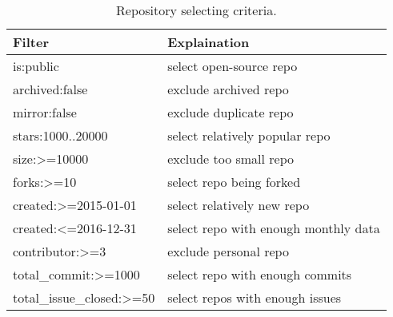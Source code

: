 \documentclass[sigconf,review,anonymous]{acmart}
\begin{document}




 

\begin{table}[!b]
\caption{Repository selecting criteria.}
\label{tbl:select}
\begin{adjustbox}{max width=0.48\textwidth}
\begin{tabular}{l|l}
\rowcolor[HTML]{BDBDBD} 
{\color[HTML]{000000} Filter} & {\color[HTML]{000000} Explaination} \\ \hline
\rowcolor[HTML]{FFFFFF} 
{\color[HTML]{000000} is:public} & {\color[HTML]{000000} select open-source repo} \\
\rowcolor[HTML]{F3F3F3} 
{\color[HTML]{000000} archived:false} & {\color[HTML]{000000} exclude archived repo} \\
\rowcolor[HTML]{FFFFFF} 
{\color[HTML]{000000} mirror:false} & {\color[HTML]{000000} exclude duplicate repo} \\
\rowcolor[HTML]{F3F3F3} 
{\color[HTML]{000000} stars:1000..20000} & {\color[HTML]{000000} select relatively popular repo} \\
\rowcolor[HTML]{FFFFFF} 
{\color[HTML]{000000} size:\textgreater{}=10000} & {\color[HTML]{000000} exclude too small repo} \\
\rowcolor[HTML]{F3F3F3} 
{\color[HTML]{000000} forks:\textgreater{}=10} & {\color[HTML]{000000} select repo being forked} \\
\rowcolor[HTML]{FFFFFF} 
{\color[HTML]{000000} created:\textgreater{}=2015-01-01} & {\color[HTML]{000000} select relatively new repo} \\
\rowcolor[HTML]{F3F3F3} 
{\color[HTML]{000000} created:\textless{}=2016-12-31} & {\color[HTML]{000000} select repo with enough monthly data} \\
\rowcolor[HTML]{FFFFFF} 
{\color[HTML]{000000} contributor:\textgreater{}=3} & {\color[HTML]{000000} exclude personal repo} \\
\rowcolor[HTML]{F3F3F3} 
{\color[HTML]{000000} total\_commit:\textgreater{}=1000} & {\color[HTML]{000000} select repo with enough commits} \\
\rowcolor[HTML]{FFFFFF} 
{\color[HTML]{000000} total\_issue\_closed:\textgreater{}=50} & {\color[HTML]{000000} select repos with enough issues} \\

\end{tabular}
\end{adjustbox}
\end{table}
\end{document}
